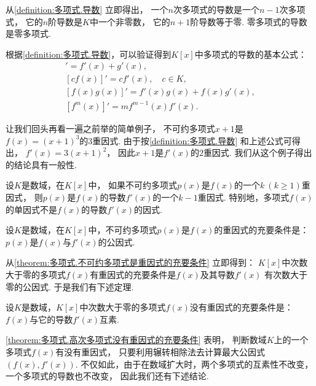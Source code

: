 从\cref{definition:多项式.导数} 立即得出，
一个\(n\)次多项式的导数是一个\(n-1\)次多项式，
它的\(n\)阶导数是\(K\)中一个非零数，
它的\(n+1\)阶导数等于零.
零多项式的导数是零多项式.

根据\cref{definition:多项式.导数}，可以验证得到\(K[x]\)中多项式的导数的基本公式：\begin{gather}
	[f(x)+g(x)]' = f'(x) + g'(x), \\
	[c f(x)]' = c f'(x), \quad c \in K, \\
	[f(x) g(x)]' = f'(x) g(x) + f(x) g'(x), \\
	[f^m(x)]' = m f^{m-1}(x) f'(x).
\end{gather}

让我们回头再看一遍之前举的简单例子，
不可约多项式\(x+1\)是\(f(x) = (x+1)^3\)的\(3\)重因式.
由于按\cref{definition:多项式.导数} 和上述公式可得出，
\(f'(x) = 3(x+1)^2\)，
因此\(x+1\)是\(f'(x)\)的\(2\)重因式.
我们从这个例子得出的结论具有一般性.

\begin{theorem}\label{theorem:多项式.多项式及其导数的重因式}
设\(K\)是数域，在\(K[x]\)中，
如果不可约多项式\(p(x)\)是\(f(x)\)的一个\(k\ (k\geq1)\)重因式，
则\(p(x)\)是\(f(x)\)的导数\(f'(x)\)的一个\(k-1\)重因式.
特别地，多项式\(f(x)\)的单因式不是\(f(x)\)的导数\(f'(x)\)的因式.
\end{theorem}

\begin{corollary}\label{theorem:多项式.不可约多项式是重因式的充要条件}
设\(K\)是数域，在\(K[x]\)中，不可约多项式\(p(x)\)是\(f(x)\)的重因式的充要条件是：
\(p(x)\)是\(f(x)\)与\(f'(x)\)的公因式.
\end{corollary}
从\cref{theorem:多项式.不可约多项式是重因式的充要条件} 立即得到：
\(K[x]\)中次数大于零的多项式\(f(x)\)有重因式的充要条件是\(f(x)\)及其导数\(f'(x)\)
有次数大于零的公因式.
于是我们有下述定理.
\begin{theorem}\label{theorem:多项式.高次多项式没有重因式的充要条件}
设\(K\)是数域，\(K[x]\)中次数大于零的多项式\(f(x)\)没有重因式的充要条件是：
\(f(x)\)与它的导数\(f'(x)\)互素.
\end{theorem}

\cref{theorem:多项式.高次多项式没有重因式的充要条件} 表明，
判断数域\(K\)上的一个多项式\(f(x)\)有没有重因式，
只要利用辗转相除法去计算最大公因式\((f(x),f'(x))\).
不仅如此，由于在数域扩大时，两个多项式的互素性不改变，一个多项式的导数也不改变，
因此我们还有下述结论.

